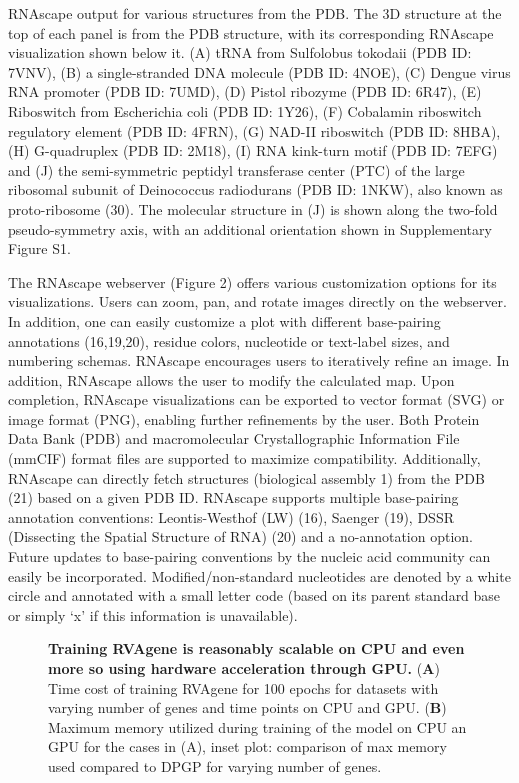 RNAscape output for various structures from the PDB. The 3D structure at the top of each panel is from the PDB structure, with its corresponding RNAscape visualization shown below it. (A) tRNA from Sulfolobus tokodaii (PDB ID: 7VNV), (B) a single-stranded DNA molecule (PDB ID: 4NOE), (C) Dengue virus RNA promoter (PDB ID: 7UMD), (D) Pistol ribozyme (PDB ID: 6R47), (E) Riboswitch from Escherichia coli (PDB ID: 1Y26), (F) Cobalamin riboswitch regulatory element (PDB ID: 4FRN), (G) NAD-II riboswitch (PDB ID: 8HBA), (H) G-quadruplex (PDB ID: 2M18), (I) RNA kink-turn motif (PDB ID: 7EFG) and (J) the semi-symmetric peptidyl transferase center (PTC) of the large ribosomal subunit of Deinococcus radiodurans (PDB ID: 1NKW), also known as proto-ribosome (30). The molecular structure in (J) is shown along the two-fold pseudo-symmetry axis, with an additional orientation shown in Supplementary Figure S1.
\par
The RNAscape webserver (Figure 2) offers various customization options for its visualizations. Users can zoom, pan, and rotate images directly on the webserver. In addition, one can easily customize a plot with different base-pairing annotations (16,19,20), residue colors, nucleotide or text-label sizes, and numbering schemas. RNAscape encourages users to iteratively refine an image. In addition, RNAscape allows the user to modify the calculated map. Upon completion, RNAscape visualizations can be exported to vector format (SVG) or image format (PNG), enabling further refinements by the user. Both Protein Data Bank (PDB) and macromolecular Crystallographic Information File (mmCIF) format files are supported to maximize compatibility. Additionally, RNAscape can directly fetch structures (biological assembly 1) from the PDB (21) based on a given PDB ID. RNAscape supports multiple base-pairing annotation conventions: Leontis-Westhof (LW) (16), Saenger (19), DSSR (Dissecting the Spatial Structure of RNA) (20) and a no-annotation option. Future updates to base-pairing conventions by the nucleic acid community can easily be incorporated. Modified/non-standard nucleotides are denoted by a white circle and annotated with a small letter code (based on its parent standard base or simply ‘x’ if this information is unavailable).
\begin{center}
    \begin{figure}
        \caption[Computational cost of training RVAgene]{\textbf{Training RVAgene is reasonably scalable on CPU and even more so using hardware acceleration through GPU.} ({\bf A}) Time cost of training RVAgene for 100 epochs for datasets with varying number of genes and time points on CPU and GPU. ({\bf B}) Maximum memory utilized during training of the model on CPU an GPU for the cases in (A), inset plot: comparison of max memory used compared to DPGP for varying number of genes.}
  \label{fig:rnascape1}
\end{figure}
\end{center}